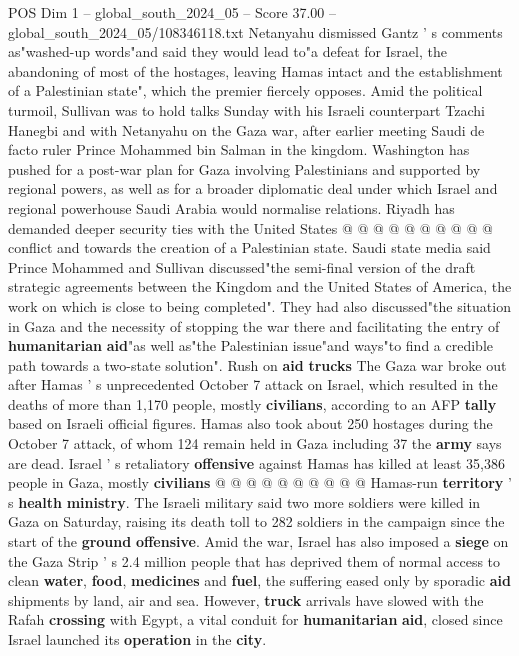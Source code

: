 \begin{textsample}{POS Dim 1 – global\_south\_2024\_05 – Score 37.00 – global\_south\_2024\_05/108346118.txt}
Netanyahu dismissed Gantz ' s comments as"washed-up words"and said they would lead to"a defeat for Israel, the abandoning of most of the hostages, leaving Hamas intact and the establishment of a Palestinian state", which the premier fiercely opposes.
Amid the political turmoil, Sullivan was to hold talks Sunday with his Israeli counterpart Tzachi Hanegbi and with Netanyahu on the Gaza war, after earlier meeting Saudi de facto ruler Prince Mohammed bin Salman in the kingdom.
Washington has pushed for a post-war plan for Gaza involving Palestinians and supported by regional powers, as well as for a broader diplomatic deal under which Israel and regional powerhouse Saudi Arabia would normalise relations.
Riyadh has demanded deeper security ties with the United States @ @ @ @ @ @ @ @ @ @ conflict and towards the creation of a Palestinian state.
Saudi state media said Prince Mohammed and Sullivan discussed"the semi-final version of the draft strategic agreements between the Kingdom and the United States of America, the work on which is close to being completed".
They had also discussed"the situation in Gaza and the necessity of stopping the war there and facilitating the entry of \textbf{humanitarian} \textbf{aid}"as well as"the Palestinian issue"and ways"to find a credible path towards a two-state solution".
Rush on \textbf{aid} \textbf{trucks} The Gaza war broke out after Hamas ' s unprecedented October 7 attack on Israel, which resulted in the deaths of more than 1,170 people, mostly \textbf{civilians}, according to an AFP \textbf{tally} based on Israeli official figures.
Hamas also took about 250 hostages during the October 7 attack, of whom 124 remain held in Gaza including 37 the \textbf{army} says are dead.
Israel ' s retaliatory \textbf{offensive} against Hamas has killed at least 35,386 people in Gaza, mostly \textbf{civilians} @ @ @ @ @ @ @ @ @ @ Hamas-run \textbf{territory} ' s \textbf{health} \textbf{ministry}.
The Israeli military said two more soldiers were killed in Gaza on Saturday, raising its death toll to 282 soldiers in the campaign since the start of the \textbf{ground} \textbf{offensive}.
Amid the war, Israel has also imposed a \textbf{siege} on the Gaza Strip ' s 2.4 million people that has deprived them of normal access to clean \textbf{water}, \textbf{food}, \textbf{medicines} and \textbf{fuel}, the suffering eased only by sporadic \textbf{aid} shipments by land, air and sea.
However, \textbf{truck} arrivals have slowed with the Rafah \textbf{crossing} with Egypt, a vital conduit for \textbf{humanitarian} \textbf{aid}, closed since Israel launched its \textbf{operation} in the \textbf{city}.

\end{textsample}
